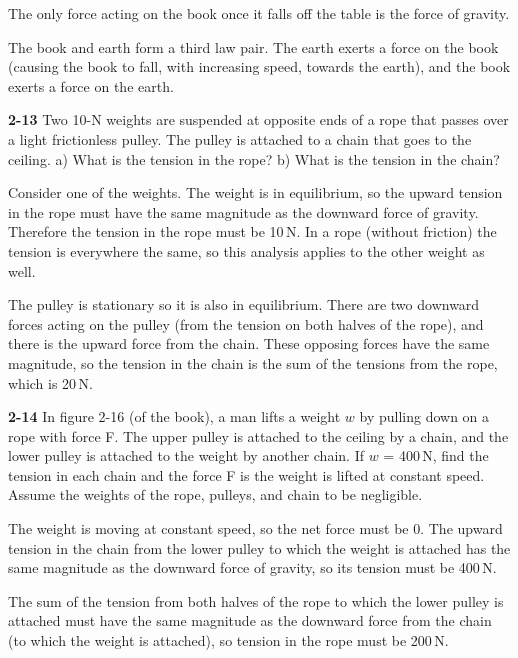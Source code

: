 \documentclass{amsart}
\begin{document}
The only force acting on the book once it falls off the table is the force of gravity.

The book and earth form a third law pair.
The earth exerts a force on the book (causing the book to fall, with increasing speed, towards the earth),
and the book exerts a force on the earth.

\vspace{\baselineskip}
\noindent
\textbf{2-13} Two 10-N weights are suspended at opposite ends of a rope that passes over a light
frictionless pulley.  The pulley is attached to a chain that goes to the ceiling.\newline
a) What is the tension in the rope?\newline
b) What is the tension in the chain?

Consider one of the weights.  The weight is in equilibrium, so the upward tension in the rope must have the same magnitude
as the downward force of gravity.  Therefore the tension in the rope must be 10\,N.  In a rope (without friction)
the tension is everywhere the same, so this analysis applies to the other weight as well.

The pulley is stationary so it is also in equilibrium.  There are two downward forces acting on the pulley
(from the tension on both halves of the rope), and there is the upward force from the chain.
These opposing forces have the same magnitude, so the tension in the chain is the sum of the tensions
from the rope, which is 20\,N.

\vspace{\baselineskip}
\noindent
\textbf{2-14} In figure 2-16 (of the book), a man lifts a weight $w$ by pulling down on a rope with force F.
The upper pulley is attached to the ceiling by a chain, and the lower pulley is attached to the weight by another chain.
If $w$ = 400\,N, find the tension in each chain and the force F is the weight is lifted at constant speed.
Assume the weights of the rope, pulleys, and chain to be negligible.

The weight is moving at constant speed, so the net force must be 0.  The upward tension in the chain from the lower pulley
to which the weight is attached has the same magnitude as the downward force of gravity, so its tension must be 400\,N.

The sum of the tension from both halves of the rope to which the lower pulley is attached must have the same magnitude
as the downward force from the chain (to which the weight is attached), so tension in the rope must be 200\,N.
\end{document}
